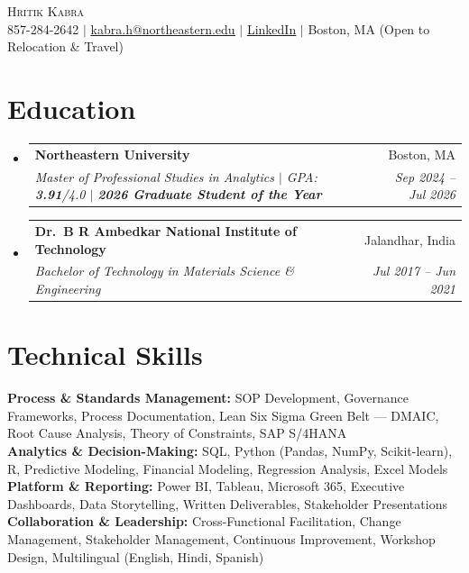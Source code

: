 \documentclass[letterpaper,10pt]{article}
\makeatletter
\newcommand{\resumeSubheading}[4]{
  \vspace{1pt}\item
    \begin{tabular*}{0.97\textwidth}[t]{l@{\extracolsep{\fill}}r}
      \textbf{#1} & #2 \\
      \textit{\small#3} & \textit{\small #4} \\
    \end{tabular*}\vspace{-4pt}
}
\newcommand{\resumeSubHeadingListStart}{\begin{itemize}[leftmargin=0.15in, label={}]}
\newcommand{\resumeSubHeadingListEnd}{\end{itemize}}
\makeatother
\begin{document}
\begin{center}
    {\LARGE \scshape \color{heading} Hritik Kabra} \\ \vspace{2pt}
    857-284-2642 $|$
    \href{mailto:kabra.h@northeastern.edu}{\underline{kabra.h@northeastern.edu}} $|$
    \href{https://www.linkedin.com/in/hritikkabra888}{\underline{LinkedIn}} $|$
    Boston, MA (Open to Relocation \& Travel)
\end{center}

\section{Education}
\resumeSubHeadingListStart
  \resumeSubheading
    {Northeastern University}{Boston, MA}
    {Master of Professional Studies in Analytics $|$ GPA: \textbf{3.91}/4.0 $|$ \textbf{2026 Graduate Student of the Year}}{Sep 2024 -- Jul 2026}
  \resumeSubheading
    {Dr.\ B R Ambedkar National Institute of Technology}{Jalandhar, India}
    {Bachelor of Technology in Materials Science \& Engineering}{Jul 2017 -- Jun 2021}
\resumeSubHeadingListEnd

\section{Technical Skills}
\begin{itemize}[leftmargin=0.15in, label={}]
  \small{\item{
    \textbf{Process \& Standards Management:} SOP Development, Governance Frameworks, Process Documentation, Lean Six Sigma Green Belt --- DMAIC, Root Cause Analysis, Theory of Constraints, SAP S/4HANA \\[3pt]
    \textbf{Analytics \& Decision-Making:} SQL, Python (Pandas, NumPy, Scikit-learn), R, Predictive Modeling, Financial Modeling, Regression Analysis, Excel Models \\[3pt]
    \textbf{Platform \& Reporting:} Power BI, Tableau, Microsoft 365, Executive Dashboards, Data Storytelling, Written Deliverables, Stakeholder Presentations \\[3pt]
    \textbf{Collaboration \& Leadership:} Cross-Functional Facilitation, Change Management, Stakeholder Management, Continuous Improvement, Workshop Design, Multilingual (English, Hindi, Spanish)
  }}
\end{itemize}

\end{document}
